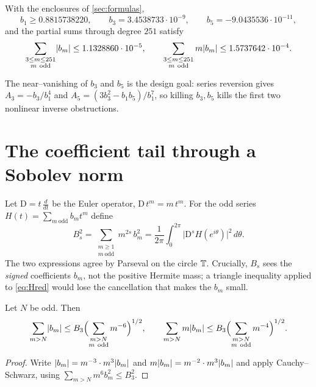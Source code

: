 \documentclass[12pt]{article}
\newcommand{\Dop}{\mathrm{D}}              %
\begin{document}
\begin{lemma}\label{lem:low}
With the enclosures of \cref{sec:formulas},
\[
   b_1\ge0.8815738220,\qquad
   b_3=3.4538733\cdot10^{-9},\qquad
   b_5=-9.0435536\cdot10^{-11},
\]
and the partial sums through degree $251$ satisfy
\begin{equation}\label{eq:heads}
   \sum_{\substack{3\le m\le251\\m\ \mathrm{odd}}}\abs{b_m}\le1.1328860\cdot10^{-5},
   \qquad
   \sum_{\substack{3\le m\le251\\m\ \mathrm{odd}}}m\abs{b_m}\le1.5737642\cdot10^{-4}.
\end{equation}
\end{lemma}

The near--vanishing of $b_3$ and $b_5$ is the design goal: series reversion gives
$A_3=-b_3/b_1^4$ and $A_5=(3b_3^2-b_1b_5)/b_1^7$, so killing $b_3,b_5$ kills the
first two nonlinear inverse obstructions.

\section{The coefficient tail through a Sobolev norm}\label{sec:sobolev}

Let $\Dop=t\,\frac{d}{dt}$ be the Euler operator, $\Dop\,t^m=m\,t^m$.  For the odd
series $H(t)=\sum_{m\ \mathrm{odd}}b_mt^m$ define
\begin{equation}\label{eq:Bs}
   B_s^2=\sum_{\substack{m\ge1\\m\ \mathrm{odd}}}m^{2s}\,b_m^2
        =\frac{1}{2\pi}\int_0^{2\pi}\bigl\lvert \Dop^sH(e^{i\theta})\bigr\rvert^2\,d\theta .
\end{equation}
The two expressions agree by Parseval on the circle $\mathbb{T}$.  Crucially, $B_s$ sees
the \emph{signed} coefficients $b_m$, not the positive Hermite mass; a triangle
inequality applied to \eqref{eq:Hred} would lose the cancellation that makes the
$b_m$ small.

\begin{lemma}\label{lem:tail}
Let $N$ be odd.  Then
\[
   \sum_{m>N}\abs{b_m}\le B_3\Bigl(\sum_{\substack{m>N\\m\ \mathrm{odd}}}m^{-6}\Bigr)^{1/2},
   \qquad
   \sum_{m>N}m\abs{b_m}\le B_3\Bigl(\sum_{\substack{m>N\\m\ \mathrm{odd}}}m^{-4}\Bigr)^{1/2}.
\]
\end{lemma}

\begin{proof}
Write $\lvert b_m\rvert=m^{-3}\cdot m^3\lvert b_m\rvert$ and $m\lvert b_m\rvert=m^{-2}\cdot m^3\lvert b_m\rvert$
and apply Cauchy--Schwarz, using $\sum_{m>N}m^6b_m^2\le B_3^2$.
\end{proof}
\end{document}
